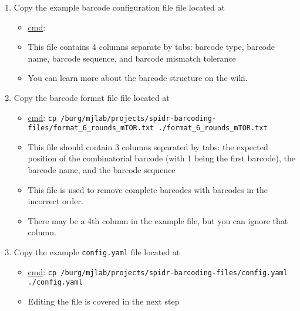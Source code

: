 \documentclass{article}
\begin{document}
\begin{enumerate}
        \item Copy the example barcode configuration file  file located at 
        \begin{itemize}
            \item \underline{cmd}: 
            \item This file contains 4 columns separate by tabs: barcode type, barcode name, barcode sequence, and barcode mismatch tolerance
            \item You can learn more about the barcode structure on the wiki.
        \end{itemize}

        \item Copy the barcode format file  file located at 
        \begin{itemize}
            \item \underline{cmd}: \texttt{cp /burg/mjlab/projects/spidr-barcoding-files/format\_6\_rounds\_mTOR.txt ./format\_6\_rounds\_mTOR.txt}
            \item This file should contain 3 columns separated by tabs: the expected position of the combinatorial barcode (with 1 being the first barcode), the barcode name, and the barcode sequence
            \item This file is used to remove complete barcodes with barcodes in the incorrect order.
            \item There may be a 4th column in the example file, but you can ignore that column.
        \end{itemize}

        \item Copy the example \texttt{config.yaml} file located at 
        \begin{itemize}
            \item \underline{cmd}: \texttt{cp /burg/mjlab/projects/spidr-barcoding-files/config.yaml ./config.yaml}
            \item Editing the file is covered in the next step
        \end{itemize}


\end{enumerate}
\end{document}
